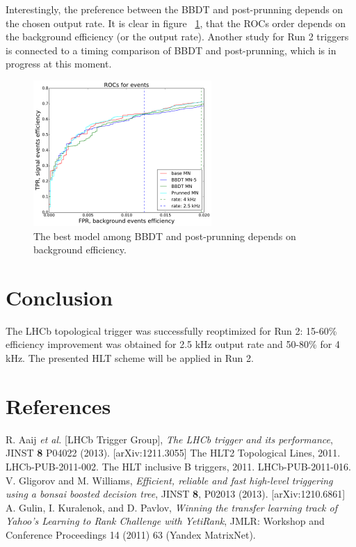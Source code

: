 \documentclass[a4paper]{jpconf}
\begin{document}
Interestingly, the preference between the BBDT and post-prunning depends on the chosen output rate. It is clear in figure~ \ref{hlt2_prunroc}, that the ROCs order depends on the background efficiency (or the output rate). Another study for Run 2 triggers is connected to a timing comparison of BBDT and post-prunning, which is in progress at this moment.

\begin{figure}[h]
\includegraphics[width=16pc]{../images/hlt2_prunroc.pdf}\hspace{2pc}%
\begin{minipage}[b]{22pc}\caption{\label{hlt2_prunroc} The best model among BBDT and post-prunning depends on background efficiency.}
\end{minipage}
\end{figure}


\section{Conclusion}
The LHCb topological trigger was successfully reoptimized for Run 2: 15-60\% efficiency improvement was obtained for 2.5 kHz output rate and 50-80\% for 4 kHz.  The presented HLT scheme will be applied in Run 2.

\section*{References}
\begin{thebibliography}{9}
 R. Aaij {\em et al.} [LHCb Trigger Group], {\em The LHCb trigger and its performance}, JINST {\bf 8} P04022 (2013). [arXiv:1211.3055]
 The HLT2 Topological Lines, 2011. LHCb-PUB-2011-002. 
 The HLT inclusive B triggers, 2011. LHCb-PUB-2011-016. 
 V. Gligorov and M. Williams, {\em Efficient, reliable and fast high-level triggering using a bonsai boosted decision tree}, JINST {\bf 8}, P02013 (2013). [arXiv:1210.6861]
 A. Gulin, I. Kuralenok, and D. Pavlov, {\em Winning the transfer learning track of Yahoo's Learning to Rank Challenge with YetiRank}, JMLR: Workshop and Conference Proceedings 14 (2011) 63 (Yandex MatrixNet).
\end{thebibliography}
\end{document}
